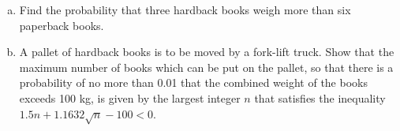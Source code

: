 \documentclass[a4paper,12pt]{article}
\begin{document}
\begin{enumerate}
\begin{enumerate}[(a)]
\item  Find the probability that three hardback books weigh more than six
paperback books.
\item  A pallet of hardback books is to be moved by a fork-lift truck. Show
that the maximum number of books which can be put on the pallet, so
that there is a probability of no more than 0.01 that the combined
weight of the books exceeds 100 kg, is given by the largest integer $n$
that satisfies the inequality
$1.5n + 1.1632 \sqrt{n} - 100 < 0$.
\end{enumerate}
\end{enumerate}
\end{document}
